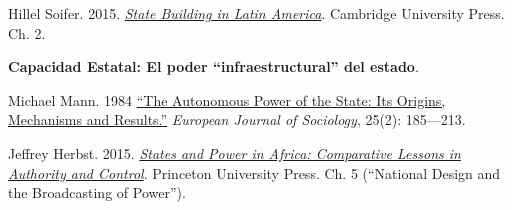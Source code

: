 \documentclass[letterpaper]{article}
\renewenvironment{itemize}{
  \begin{list}{}{
    \setlength{\leftmargin}{1.5em}
  }
}{
  \end{list}
}
\begin{document}
\begin{enumerate}[label=\roman*.]
\begin{itemize}
\begin{itemize}
          \item[$\circ$]  Hillel Soifer. 2015. \href{https://github.com/hbahamonde/Ciencia_Politica_II/raw/master/Readings/Soifer.pdf}{\emph{State Building in Latin America}}. Cambridge University Press. Ch. 2.
				\end{itemize}

			\item[8.] {\bf Capacidad Estatal: El poder ``infraestructural'' del estado}.
				\begin{itemize}
         	\item[$\circ$] Michael Mann. 1984 \href{https://github.com/hbahamonde/Ciencia_Politica_II/raw/master/Readings/Mann_1984.pdf}{``The Autonomous Power of the State: Its Origins, Mechanisms and Results.''} \emph{European Journal of Sociology}, 25(2): 185---213. %
					
					

          \item[$\circ$] Jeffrey Herbst. 2015. \href{https://github.com/hbahamonde/Ciencia_Politica_II/raw/master/Readings/Herbst.pdf}{\emph{States and Power in Africa: Comparative Lessons in Authority and Control}}. Princeton University Press. Ch. 5 (``National Design and the Broadcasting of Power'').

				\end{itemize}




\end{itemize}
\end{enumerate}
\end{document}
